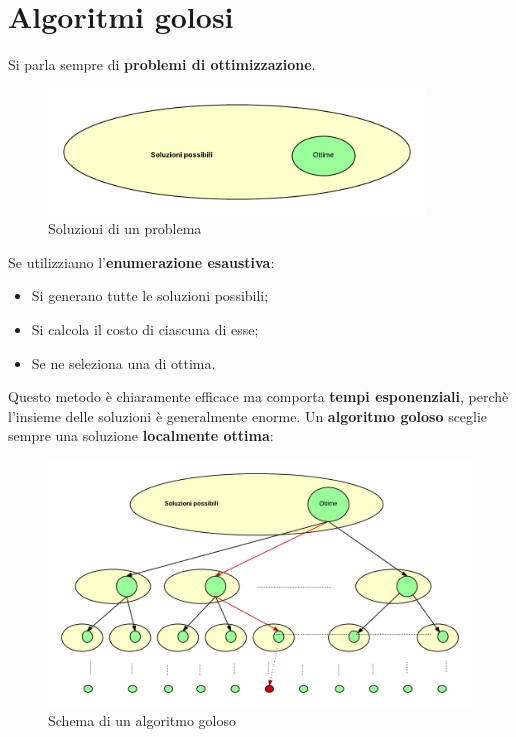 \section{Algoritmi golosi}

Si parla sempre di \textbf{problemi di ottimizzazione}.

\begin{figure}[htbp]
\centering
\includegraphics[width=100mm]{images/gready1.png}
\caption{Soluzioni di un problema}
\end{figure}

Se utilizziamo l'\textbf{enumerazione esaustiva}:

\begin{itemize}

\item Si generano tutte le soluzioni possibili;
\item Si calcola il costo di ciascuna di esse;
\item Se ne seleziona una di ottima.

\end{itemize}

Questo metodo è chiaramente efficace ma comporta \textbf{tempi esponenziali}, perchè l'insieme delle soluzioni è generalmente enorme.
\linebreak[2]
Un \textbf{algoritmo goloso} sceglie sempre una soluzione \textbf{localmente ottima}:

\begin{figure}[htpd]
\centering
\includegraphics[width=130mm]{images/gready2.png}
\caption{Schema di un algoritmo goloso}
\end{figure}


